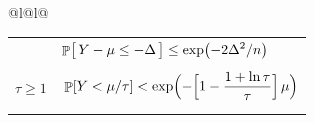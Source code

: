 \begin{center}
{\begin{tabular}[t]{@{}l@{\qquad}l@{}}
\begin{tabular}[t]{l l l}
            &
              \multicolumn{2}{l}{
              \begin{math}%
                      \ds%
                      \Prob{\bigl.\, Y - \mu \leq -\Delta \, }%
                      \leq%
                      \exp\pth{ -2 \Delta^2/n}
                  \end{math}
              }
              \\
            & &
              \corref{useful:chernoff:2}%
            \\%
            \midrule
            $\tau \geq 1$
            &
              \multicolumn{2}{l}{%
              $\bigg.\Prob{ Y < \mu/\tau } < \exp\Bigl(- \Bigl[1 -
              \displaystyle
              \frac{1 + \ln \tau}{\tau}\Bigr]\, \mu\Bigr)$
              }
            \\
            &
            &
              \thmref{Chernoff:2}\\
            \bottomrule 
          \end{tabular}
        \end{tabular}%
        }

        \medskip


\end{center}
